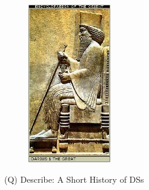 \documentclass[12pt]{article}
\begin{document}
\begin{figure}[H]
\includegraphics[width=0.5\linewidth]{page13-image-2.png}
\end{figure}
\clearpage
(Q)
Describe: A Short History of DSs
\clearpage
\end{document}
